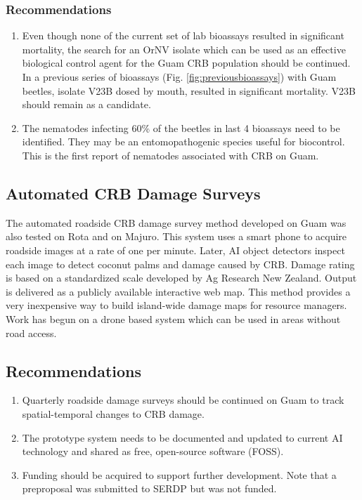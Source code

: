 \documentclass[12pt,letterpaper,english,bibliography=totocnumbered, abstract=on]{scrartcl}
\begin{document}
\subsubsection{Recommendations}
\begin{enumerate}
	\item Even though none of the current set of lab bioassays resulted in significant mortality, the search for an OrNV isolate which can be used as an effective biological control agent for the Guam CRB population should be continued. In a previous series of bioassays (Fig. \ref{fig:previousbioassays}) with Guam beetles, isolate V23B dosed by mouth, resulted in significant mortality. V23B should remain as a candidate.
	\item The nematodes infecting 60\% of the beetles in last 4 bioassays need to be identified. They may be an entomopathogenic species useful for biocontrol. This is the first report of nematodes associated with CRB on Guam.
\end{enumerate}

\subsection{Automated CRB Damage Surveys}

The automated roadside CRB damage survey method developed on Guam was also tested on Rota and on Majuro. This system uses a smart phone to acquire roadside images at a rate of one per minute. Later, AI object detectors inspect each image to detect coconut palms and damage caused by CRB. Damage rating is based on a standardized scale developed by Ag Research New Zealand. Output is delivered as a publicly available interactive web map. This method provides a very inexpensive way to build island-wide damage maps for resource managers. Work has begun on a drone based system which can be used in areas without road access.

\subsection{Recommendations}

\begin{enumerate}
	\item Quarterly roadside damage surveys should be continued on Guam to track spatial-temporal changes to CRB damage.
	\item The prototype system needs to be documented and updated to current AI technology and shared as free, open-source software (FOSS).
	\item Funding should be acquired to support further development. Note that a preproposal was submitted to SERDP but was not funded.
\end{enumerate}
\end{document}
